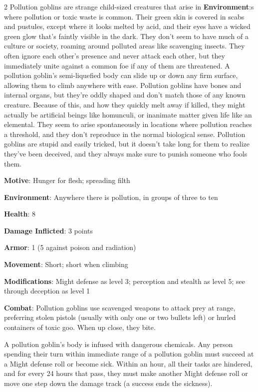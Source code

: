 \begin{multicols}{2}
Pollution goblins are strange child-sized creatures that arise in \textbf{Environment}:s where pollution or toxic waste is common. Their green skin is covered in scabs and pustules, except where it looks melted by acid, and their eyes have a wicked green glow that’s faintly visible in the dark. They don’t seem to have much of a culture or society, roaming around polluted areas like scavenging insects. They often ignore each other’s presence and never attack each other, but they immediately unite against a common foe if any of them are threatened. A pollution goblin’s semi-liquefied body can slide up or down any firm surface, allowing them to climb anywhere with ease. Pollution goblins have bones and internal organs, but they’re oddly shaped and don’t match those of any known creature. Because of this, and how they quickly melt away if killed, they might actually be artificial beings like homunculi, or inanimate matter given life like an elemental. They seem to arise spontaneously in locations where pollution reaches a threshold, and they don’t reproduce in the normal biological sense. Pollution goblins are stupid and easily tricked, but it doesn’t take long for them to realize they’ve been deceived, and they always make sure to punish someone who fools them.

\textbf{Motive}: Hunger for flesh; spreading filth 

\textbf{Environment}: Anywhere there is pollution, in groups of three to ten 

\textbf{Health}: 8 

\textbf{Damage Inflicted}: 3 points 

\textbf{Armor}: 1 (5 against poison and radiation) 

\textbf{Movement}: Short; short when climbing 

\textbf{Modifications}: Might defense as level 3; perception and stealth as level 5; see through deception as level 1 

\textbf{Combat}: Pollution goblins use scavenged weapons to attack prey at range, preferring stolen pistols (usually with only one or two bullets left) or hurled containers of toxic goo. When up close, they bite. 

A pollution goblin’s body is infused with dangerous chemicals. Any person spending their turn within immediate range of a pollution goblin must succeed at a Might defense roll or become sick. Within an hour, all their tasks are hindered, and for every 24 hours that pass, they must make another Might defense roll or move one step down the damage track (a success ends the sickness). 


\end{multicols}
